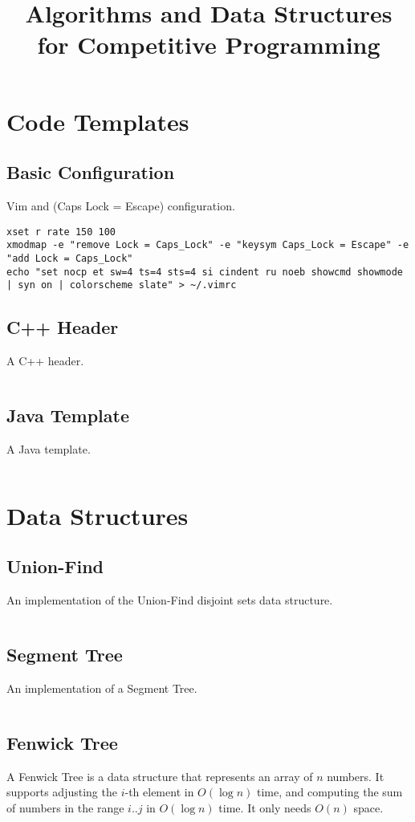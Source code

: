 \documentclass[8pt,a4paper]{amsart}
\title{Algorithms and Data Structures for Competitive Programming}
\newcommand{\code}[1]{\inputminted[linenos]{cpp}{_code/#1}}
\begin{document}
\maketitle
\tableofcontents
\newpage

\section{Code Templates}
    \subsection{Basic Configuration}
        Vim and (Caps Lock = Escape) configuration.
        \begin{verbatim}
xset r rate 150 100
xmodmap -e "remove Lock = Caps_Lock" -e "keysym Caps_Lock = Escape" -e "add Lock = Caps_Lock"
echo "set nocp et sw=4 ts=4 sts=4 si cindent ru noeb showcmd showmode | syn on | colorscheme slate" > ~/.vimrc
        \end{verbatim}

    \subsection{C++ Header}
        A C++ header.
        \code{header.cpp}

    \subsection{Java Template}
        A Java template.
        \code{template.java}


\section{Data Structures}

    \subsection{Union-Find}
        An implementation of the Union-Find disjoint sets data structure.
        \code{data-structures/union_find.cpp}

    \subsection{Segment Tree}
        An implementation of a Segment Tree.
        \code{data-structures/segment_tree.cpp}

    \subsection{Fenwick Tree}
        A Fenwick Tree is a data structure that represents an array of $n$
        numbers. It supports adjusting the $i$-th element in $O(\log n)$ time,
        and computing the sum of numbers in the range $i..j$ in $O(\log n)$
        time. It only needs $O(n)$ space.
        \code{data-structures/fenwick_tree.cpp}
\end{document}
